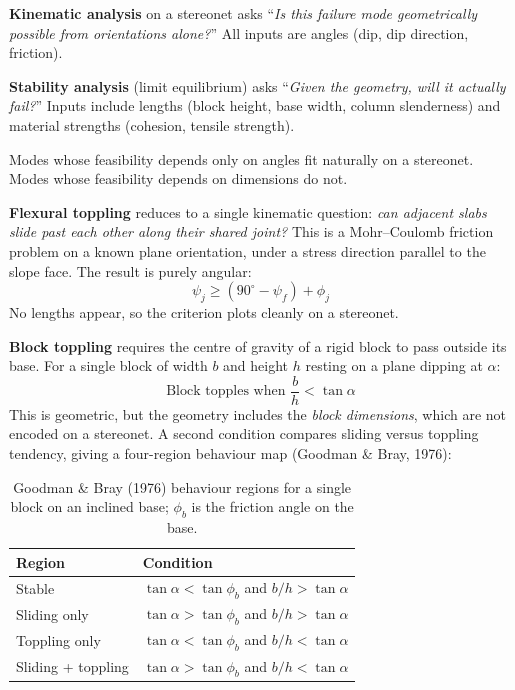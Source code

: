 \documentclass[a4paper,12pt]{article}
\begin{document}
\begin{notebox}
\textbf{Kinematic analysis} on a stereonet asks ``\emph{Is this failure mode geometrically possible from orientations alone?}'' All inputs are angles (dip, dip direction, friction).

\textbf{Stability analysis} (limit equilibrium) asks ``\emph{Given the geometry, will it actually fail?}'' Inputs include lengths (block height, base width, column slenderness) and material strengths (cohesion, tensile strength).

Modes whose feasibility depends only on angles fit naturally on a stereonet. Modes whose feasibility depends on dimensions do not.
\end{notebox}

\textbf{Flexural toppling} reduces to a single kinematic question: \emph{can adjacent slabs slide past each other along their shared joint?} This is a Mohr--Coulomb friction problem on a known plane orientation, under a stress direction parallel to the slope face. The result is purely angular:
\[
\psi_j \geq (90^\circ - \psi_f) + \phi_j
\]
No lengths appear, so the criterion plots cleanly on a stereonet.

\textbf{Block toppling} requires the centre of gravity of a rigid block to pass outside its base. For a single block of width $b$ and height $h$ resting on a plane dipping at $\alpha$:
\[
\boxed{\text{Block topples when } \frac{b}{h} < \tan\alpha}
\]
This is geometric, but the geometry includes the \emph{block dimensions}, which are not encoded on a stereonet. A second condition compares sliding versus toppling tendency, giving a four-region behaviour map (Goodman \& Bray, 1976):

\begin{table}[h!]
\centering
\begin{tabularx}{\textwidth}{l X}
\toprule
\textbf{Region} & \textbf{Condition} \\
\midrule
Stable & $\tan\alpha < \tan\phi_b$ \quad and \quad $b/h > \tan\alpha$ \\
Sliding only & $\tan\alpha > \tan\phi_b$ \quad and \quad $b/h > \tan\alpha$ \\
Toppling only & $\tan\alpha < \tan\phi_b$ \quad and \quad $b/h < \tan\alpha$ \\
Sliding + toppling & $\tan\alpha > \tan\phi_b$ \quad and \quad $b/h < \tan\alpha$ \\
\bottomrule
\end{tabularx}
\caption{Goodman \& Bray (1976) behaviour regions for a single block on an inclined base; $\phi_b$ is the friction angle on the base.}
\end{table}
\end{document}

